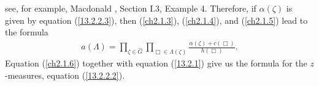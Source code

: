 \documentclass[12pt]{amsart}
\theoremstyle{definition}
\numberwithin{equation}{section}
\begin{document}
see, for example, Macdonald \cite{Macdonald}, Section I.3, Example 4. Therefore, if $\alpha(\zeta)$
is given by equation (\ref{13.2.2.3}), then (\ref{ch2.1.3}), (\ref{ch2.1.4}), and
(\ref{ch2.1.5}) lead to the formula
\begin{equation}\label{ch2.1.6}
\begin{split}
a(\Lambda)
=\prod\limits_{\zeta\in\hat{G}}\prod\limits_{\Box\in\Lambda(\zeta)}\frac{\alpha(\zeta)+c(\Box)}{h(\Box)}.
\end{split}
\end{equation}
Equation (\ref{ch2.1.6}) together with equation (\ref{13.2.1}) give us the formula for the $z$-measures, equation (\ref{13.2.2.2}).
\end{document}
